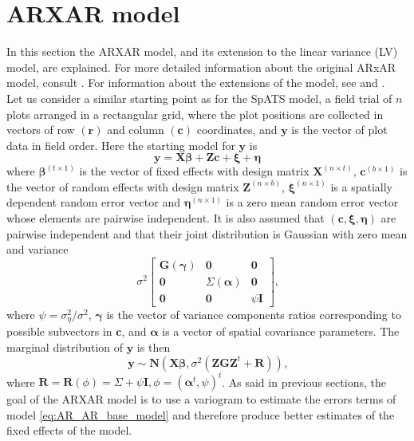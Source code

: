 \section{ARXAR model}
In this section the ARXAR model, and its extension to the linear variance (LV) model, are explained. For more detailed information about the original ARxAR model, consult \textcite{gilmour_accounting_1997}. For information about the extensions of the model, see \textcite{Piepho2010} and \textcite{williams_neighbour_1986}.\\
Let us consider a similar starting point as for the SpATS model, a field trial of $n$ plots arranged in a rectangular grid, where the plot positions are collected in vectors of row $(\mathbf{r})$ and column $(\mathbf{c})$ coordinates, and $\mathbf{y}$ is the vector of plot data in field order. Here the starting model for $\mathbf{y}$ is
\begin{equation}
    \mathbf{y}=\mathbf{X} \boldsymbol{\beta}+\mathbf{Z c}+\boldsymbol{\xi}+\boldsymbol{\eta}
    \label{eq:AR_AR_base_model}
\end{equation}
where $\boldsymbol{\beta}^{(t \times 1)}$ is the vector of fixed effects with design matrix $\mathbf{X}^{(n \times t)}$, $\mathbf{c}^{(b \times 1)}$ is the vector of random effects with design matrix $\mathbf{Z}^{(n \times b)}$, $\boldsymbol{\xi}^{(n \times 1)}$ is a spatially dependent random error vector and $\boldsymbol{\eta}^{(n \times 1)}$ is a zero mean random error vector whose elements are pairwise independent. 
It is also assumed that $(\mathbf{c}, \boldsymbol{\xi}, \boldsymbol{\eta})$ are pairwise independent and that their joint distribution is Gaussian with zero mean and variance
\begin{equation}
    \sigma^{2} \left[ 
        \begin{array}{ccc}{\mathbf{G}(\boldsymbol{\gamma})} & {\mathbf{0}} & {\mathbf{0}} \\ {\mathbf{0}} & {\Sigma(\boldsymbol{\alpha})} & {\mathbf{0}} \\ {\mathbf{0}} & {\mathbf{0}} & {\psi \mathbf{I}}
        \end{array}
    \right]
    \text{,}
\end{equation}
where $\psi = \sigma^2_{\eta}/\sigma^2$, $\boldsymbol{\gamma}$ is the vector of variance components ratios corresponding to possible subvectors in $\mathbf{c}$, and $\boldsymbol{\alpha}$ is a vector of spatial covariance parameters. The marginal distribution of $\mathbf{y}$ is then 
\begin{equation}
    \mathbf{y} \sim \mathbf{N}\left(\mathbf{X} \boldsymbol{\beta}, \sigma^{2}\left(\mathbf{Z} \mathbf{G} \mathbf{Z}^{t}+\mathbf{R}\right)\right)
    \text{,}
    \label{eq:y_distribtuion_AR}
\end{equation}
where $\mathbf{R}=\mathbf{R}(\phi)=\Sigma+\psi \mathbf{I}, \phi=\left(\boldsymbol{\alpha}^{t}, \psi\right)^{t}$.
As said in previous sections, the goal of the ARXAR model is to use a variogram to estimate the errors terms of model \ref{eq:AR_AR_base_model} and therefore produce better estimates of the fixed effects of the model.\\

